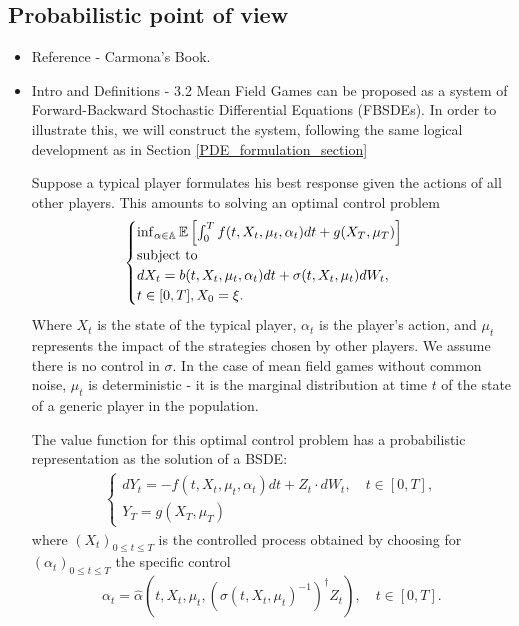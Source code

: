\documentclass{article}
\begin{document}
\subsection{Probabilistic point of view}
\begin{itemize}
    \item Reference - Carmona's Book.
    \item Intro and Definitions - 3.2
Mean Field Games can be proposed as a system of Forward-Backward Stochastic Differential Equations (FBSDEs). In order to illustrate this, we will construct the system, following the same logical development as in Section \ref{PDE_formulation_section}

Suppose a typical player formulates his best response given the actions of all other players. This amounts to solving an optimal control problem
\begin{equation}
\begin{split}
\begin{cases}
   \inf_{\alpha \in \mathbb{A}} \mathbb{E} \left[ \int_0^T f(t,X_t, \mu_t, \alpha_t) dt + g(X_T, \mu_T)\right]  \\
    \text{subject to}\\
     dX_t = b(t,X_t, \mu_t, \alpha_t) dt + \sigma(t, X_t, \mu_t) dW_t, \\ 
     t \in [0,T], X_0 = \xi.
\end{cases}
\end{split}
\end{equation}
    Where $X_t$ is the state of the typical player, $\alpha_t$ is the player's action, and $\mu_t$ represents the impact of the strategies chosen by other players. We assume there is no control in $\sigma$. In the case of mean field games without common noise, $\mu_t$ is deterministic - it is the marginal distribution at time $t$ of the state of a generic player in the population.

    The value function for this optimal control problem has a probabilistic representation as the solution of a BSDE:
\begin{equation}
    \begin{split}
    \begin{cases}
        dY_t = - f(t,X_t, \mu_t, \alpha_t) dt + Z_t \cdot dW_t, \quad t \in [0,T],\\
        Y_T = g(X_T, \mu_T)
    \end{cases}
    \end{split}
\end{equation}
    where $(X_t)_{0 \leq t \leq T}$ is the controlled process obtained by choosing for $(\alpha_t)_{0\leq t \leq T}$ the specific control 
    $$
    \alpha_t = {\hat \alpha} \left( t, X_t, \mu_t, \left(\sigma(t,X_t,\mu_t)^{-1}\right)^{\dagger} Z_t \right), \quad t \in [0,T].
    $$
    

\end{itemize}
\end{document}
